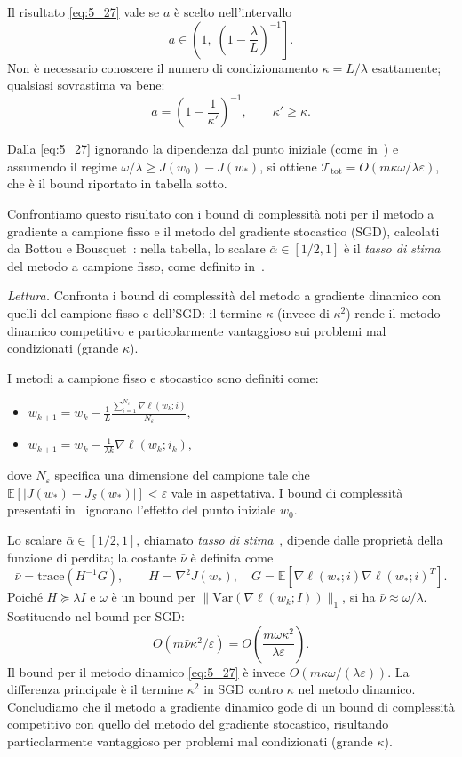 \documentclass[a4paper,12pt]{article}
\numberwithin{equation}{section}
\numberwithin{figure}{section}
\numberwithin{table}{section}
\begin{document}
Il risultato \eqref{eq:5_27} vale se \(a\) è scelto nell'intervallo
\[
a \in \left(1,\; \left(1 - \frac{\lambda}{L}\right)^{-1}\right].
\]
Non è necessario conoscere il numero di condizionamento \(\kappa = L/\lambda\) esattamente; qualsiasi sovrastima va bene:
\[
a = \left(1 - \frac{1}{\kappa'}\right)^{-1}, \qquad \kappa' \ge \kappa. \tag{5.28}\label{eq:5_28}
\]

Dalla \eqref{eq:5_27} ignorando la dipendenza dal punto iniziale (come in~\cite{bottou2008}) e assumendo il regime $\omega/\lambda \geq J(w_0)-J(w_*)$, si ottiene $\mathcal{T}_{\mathrm{tot}} = O(m\kappa\omega/\lambda\varepsilon)$, che è il bound riportato in tabella sotto.

Confrontiamo questo risultato con i bound di complessità noti per il metodo a gradiente a campione fisso e il metodo del gradiente stocastico (SGD), calcolati da Bottou e Bousquet~\cite{bottou2008}: nella tabella, lo scalare $\bar{\alpha} \in [1/2, 1]$ è il \textit{tasso di stima} del metodo a campione fisso, come definito in~\cite{bottou2008}.

\noindent\emph{Lettura.} Confronta i bound di complessità del metodo a gradiente dinamico con quelli del campione fisso e dell'SGD: il termine $\kappa$ (invece di $\kappa^2$) rende il metodo dinamico competitivo e particolarmente vantaggioso sui problemi mal condizionati (grande $\kappa$).

I metodi a campione fisso e stocastico sono definiti come:
\begin{itemize}
  \item {} \(w_{k+1} = w_k - \frac{1}{L} \frac{\sum_{i=1}^{N_\varepsilon} \nabla \ell(w_k;i)}{N_\varepsilon}\),
  \item {} \(w_{k+1} = w_k - \frac{1}{\lambda k} \nabla \ell(w_k; i_k)\),
\end{itemize}
dove \(N_\varepsilon\) specifica una dimensione del campione tale che \(\mathbb{E}[|J(w_*) - J_{\mathcal{S}}(w_*)|] < \varepsilon\) vale in aspettativa. I bound di complessità presentati in~\cite{bottou2008} ignorano l'effetto del punto iniziale \(w_0\).

Lo scalare \(\bar{\alpha} \in [1/2, 1]\), chiamato \textit{tasso di stima}~\cite{bottou2008}, dipende dalle proprietà della funzione di perdita; la costante \(\bar{\nu}\) è definita come
\[
\bar{\nu} = \mathrm{trace}(H^{-1}G), \qquad H = \nabla^2 J(w_*), \quad G = \mathbb{E}[\nabla \ell(w_*; i) \nabla \ell(w_*; i)^T]. \tag{5.29}\label{eq:5_29}
\]
Poiché \(H \succeq \lambda I\) e \(\omega\) è un bound per \(\|\mathrm{Var}(\nabla \ell(w_k;I))\|_1\), si ha \(\bar{\nu} \approx \omega/\lambda\). Sostituendo nel bound per SGD:
\[
O(m\bar{\nu}\kappa^2/\varepsilon) = O\!\left(\frac{m \omega \kappa^2}{\lambda \varepsilon}\right). \tag{5.30}\label{eq:5_30}
\]
Il bound per il metodo dinamico \eqref{eq:5_27} è invece \(O(m\kappa\omega/(\lambda\varepsilon))\). La differenza principale è il termine \(\kappa^2\) in SGD contro \(\kappa\) nel metodo dinamico. Concludiamo che il metodo a gradiente dinamico gode di un bound di complessità competitivo con quello del metodo del gradiente stocastico, risultando particolarmente vantaggioso per problemi mal condizionati (grande \(\kappa\)).
\end{document}
